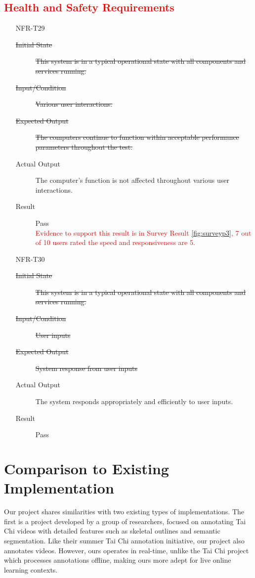 \documentclass[12pt, titlepage]{article}
\newcommand{\rt}[1]{\textcolor{red}{#1}}
\begin{document}
  \rt{ \subsection{Health and Safety Requirements} }
  \begin{enumerate}
    \item[NFR-T29] \label{NFRT29}
      \begin{description}
      \item[\sout{Initial State}] \sout{This system is in a typical operational
          state with all components and services running.}
      \item[\sout{Input/Condition}] \sout{Various user interactions.}
      \item[\sout{Expected Output}] \sout{The computers continue to function within
          acceptable performance parameters throughout the test.}
      \item[Actual Output] The computer's function is not affected throughout various
        user interactions.
      \item[Result] Pass \\
        \rt{Evidence to support this result is in Survey Result \ref{fig:surveyp3},
          7 out of 10 users rated the speed and responsiveness are 5.}
      \end{description}
    \item[NFR-T30] \label{NFRT30}
      \begin{description}
      \item[\sout{Initial State}] \sout{This system is in a typical operational
          state with all components and services running.}
      \item[\sout{Input/Condition}] \sout{User inputs}
      \item[\sout{Expected Output}] \sout{System response from user inputs}
      \item[Actual Output] The system responds appropriately and efficiently to user
        inputs.
      \item[Result] Pass
      \end{description}
    \end{enumerate}

\section{Comparison to Existing Implementation}

Our project shares similarities with two existing types of implementations. The
first is a project developed by a group of researchers, focused on annotating
Tai Chi videos with detailed features such as skeletal outlines and semantic
segmentation. Like their summer Tai Chi annotation initiative, our project also
annotates videos. However, ours operates in real-time, unlike the Tai Chi
project which processes annotations offline, making ours more adept for live
online learning contexts.
\end{document}
